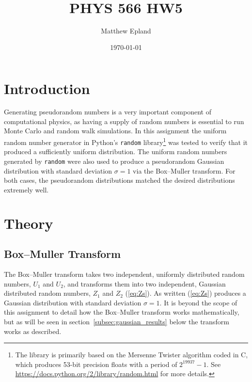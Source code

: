 \documentclass[notitlepage,aps,prd,nofootinbib]{revtex4-1}
\begin{document}
\title{PHYS 566 HW5}
\author{Matthew Epland}

\date{\today}

\begin{abstract}
\end{abstract}\maketitle

\section{Introduction}
\label{sec:intro}
Generating pseudorandom numbers is a very important component of computational physics, as having a supply of random numbers is essential to run Monte Carlo and random walk simulations. In this assignment the uniform random number generator in Python's \texttt{random} library\footnote{The library is primarily based on the Mersenne Twister algorithm coded in C, which produces 53-bit precision floats with a period of $2^{19937}-1$. See \url{https://docs.python.org/2/library/random.html} for more details.} was tested to verify that it produced a sufficiently uniform distribution. The uniform random numbers generated by \texttt{random} were also used to produce a pseudorandom Gaussian distribution with standard deviation $\sigma = 1$ via the Box--Muller transform. For both cases, the pseudorandom distributions matched the desired distributions extremely well.

\section{Theory}
\label{sec:theory}
\subsection{Box--Muller Transform}
\label{subsec:box_muller}
The Box--Muller transform takes two independent, uniformly distributed random numbers, $U_{1}$ and $U_{2}$, and transforms them into two independent, Gaussian distributed random numbers, $Z_{1}$ and $Z_{2}$ (\ref{eq:Zs}). As written (\ref{eq:Zs}) produces a Gaussian distribution with standard deviation $\sigma = 1$. It is beyond the scope of this assignment to detail how the Box--Muller transform works mathematically, but as will be seen in section~\ref{subsec:gaussian_results} below the transform works as described.
\end{document}
